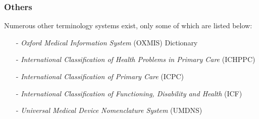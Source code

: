 %
%
%
%
%
%
%

\subsubsection{Others}
\label{others_heading}

Numerous other terminology systems exist, only some of which are listed below:

\begin{itemize}
    \item[-] \emph{Oxford Medical Information System} (OXMIS) Dictionary
    \item[-] \emph{International Classification of Health Problems in Primary Care} (ICHPPC)
    \item[-] \emph{International Classification of Primary Care} (ICPC)
    \item[-] \emph{International Classification of Functioning, Disability and Health} (ICF)
    \item[-] \emph{Universal Medical Device Nomenclature System} (UMDNS)
\end{itemize}

